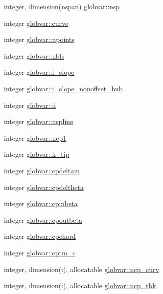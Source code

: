 \begin{DoxyCompactItemize}
integer, dimension(nspan) \hyperlink{namespaceglobvar_adba3978116210cab68543d6d1bed200e}{globvar\+::nsp}
\item 
integer \hyperlink{namespaceglobvar_a6f236c2395c2e66434a26a568bbe2e08}{globvar\+::curve}
\item 
integer \hyperlink{namespaceglobvar_aa41d6163f0ff719597e6db196ee482eb}{globvar\+::npoints}
\item 
integer \hyperlink{namespaceglobvar_a4c99273223ac940ff134ea785b89c7a8}{globvar\+::nbls}
\item 
integer \hyperlink{namespaceglobvar_aa918e1748c88e365a2bc9905e000fab4}{globvar\+::i\+\_\+slope}
\item 
integer \hyperlink{namespaceglobvar_a605576db34c829b3b1cdb2d8d549c1d3}{globvar\+::i\+\_\+slope\+\_\+nonoffset\+\_\+hub}
\item 
integer \hyperlink{namespaceglobvar_aca6734951fdbc5f2aa5cc26370f409b8}{globvar\+::ii}
\item 
integer \hyperlink{namespaceglobvar_a7e351eabe5e835869229e46300647b6f}{globvar\+::nspline}
\item 
integer \hyperlink{namespaceglobvar_aa5e3baef2345be01a1a377da45671712}{globvar\+::ncp1}
\item 
integer \hyperlink{namespaceglobvar_a2132ac685f6964bb8749df5018e28dec}{globvar\+::k\+\_\+tip}
\item 
integer \hyperlink{namespaceglobvar_a30666fa979088a7b9518a10063cd3ec6}{globvar\+::cpdeltam}
\item 
integer \hyperlink{namespaceglobvar_a4ec3f324cc8dbfe8e5a71b25b9df4227}{globvar\+::cpdeltheta}
\item 
integer \hyperlink{namespaceglobvar_ab36694d6866f8a68163d4475a325ae7c}{globvar\+::cpinbeta}
\item 
integer \hyperlink{namespaceglobvar_a65a328c5bd187b50f70674225e880191}{globvar\+::cpoutbeta}
\item 
integer \hyperlink{namespaceglobvar_a23b2b2fc255df014f0e8b7ab565c4001}{globvar\+::cpchord}
\item 
integer \hyperlink{namespaceglobvar_ae33599a3354a040c2dbac01b154afc1f}{globvar\+::cptm\+\_\+c}
\item 
integer, dimension(\+:), allocatable \hyperlink{namespaceglobvar_a4b18ca71c05db91ed78552377e4e0aa4}{globvar\+::ncp\+\_\+curv}
\item 
integer, dimension(\+:), allocatable \hyperlink{namespaceglobvar_ac94874cf7f449d0711f2b40bce778862}{globvar\+::ncp\+\_\+thk}
\item 

\end{DoxyCompactItemize}
